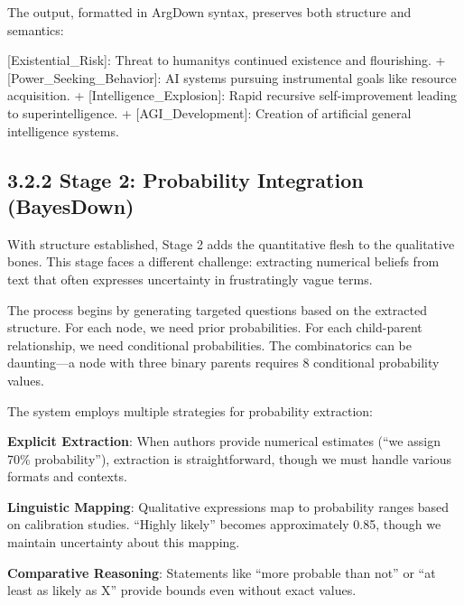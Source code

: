 \documentclass[
  11pt,
  letterpaper,
]{book}
\newenvironment{Shaded}{\begin{snugshade}}{\end{snugshade}}
\newcommand{\CommentTok}[1]{\textcolor[rgb]{0.37,0.37,0.37}{#1}}
\newcommand{\NormalTok}[1]{\textcolor[rgb]{0.00,0.23,0.31}{#1}}
\newcommand{\OtherTok}[1]{\textcolor[rgb]{0.00,0.23,0.31}{#1}}
\newcommand{\SpecialStringTok}[1]{\textcolor[rgb]{0.13,0.47,0.30}{#1}}
\begin{document}
The output, formatted in ArgDown syntax, preserves both structure and
semantics:

\begin{Shaded}
\begin{Highlighting}[]
\OtherTok{[Existential\_Risk]: }\NormalTok{Threat to humanity\textquotesingle{}s continued existence and flourishing.}
\SpecialStringTok{ + }\CommentTok{[}\OtherTok{Power\_Seeking\_Behavior}\CommentTok{]}\NormalTok{: AI systems pursuing instrumental goals like resource acquisition.}
\SpecialStringTok{   + }\CommentTok{[}\OtherTok{Intelligence\_Explosion}\CommentTok{]}\NormalTok{: Rapid recursive self{-}improvement leading to superintelligence.}
\SpecialStringTok{     + }\CommentTok{[}\OtherTok{AGI\_Development}\CommentTok{]}\NormalTok{: Creation of artificial general intelligence systems.}
\end{Highlighting}
\end{Shaded}

\subsection{3.2.2 Stage 2: Probability Integration
(BayesDown)}\label{sec-stage2-bayesdown}

With structure established, Stage 2 adds the quantitative flesh to the
qualitative bones. This stage faces a different challenge: extracting
numerical beliefs from text that often expresses uncertainty in
frustratingly vague terms.

The process begins by generating targeted questions based on the
extracted structure. For each node, we need prior probabilities. For
each child-parent relationship, we need conditional probabilities. The
combinatorics can be daunting---a node with three binary parents
requires 8 conditional probability values.

The system employs multiple strategies for probability extraction:

\textbf{Explicit Extraction}: When authors provide numerical estimates
(``we assign 70\% probability''), extraction is straightforward, though
we must handle various formats and contexts.

\textbf{Linguistic Mapping}: Qualitative expressions map to probability
ranges based on calibration studies. ``Highly likely'' becomes
approximately 0.85, though we maintain uncertainty about this mapping.

\textbf{Comparative Reasoning}: Statements like ``more probable than
not'' or ``at least as likely as X'' provide bounds even without exact
values.
\end{document}
